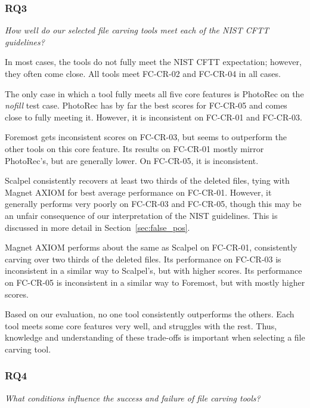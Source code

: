 \subsubsection{RQ3}

\emph{How well do our selected file carving tools meet each of the NIST CFTT guidelines?}

In most cases, the tools do not fully meet the NIST CFTT expectation; however, they often come close.
All tools meet FC-CR-02 and FC-CR-04 in all cases.

The only case in which a tool fully meets all five core features is PhotoRec on the \emph{nofill} test case.
PhotoRec has by far the best scores for FC-CR-05 and comes close to fully meeting it.
However, it is inconsistent on FC-CR-01 and FC-CR-03.

Foremost gets inconsistent scores on FC-CR-03, but seems to outperform the other tools on this core feature.
Its results on FC-CR-01 mostly mirror PhotoRec's, but are generally lower.
On FC-CR-05, it is inconsistent.

Scalpel consistently recovers at least two thirds of the deleted files, tying with Magnet AXIOM for best average performance on FC-CR-01.
However, it generally performs very poorly on FC-CR-03 and FC-CR-05, though this may be an unfair consequence of our interpretation of the NIST guidelines.
This is discussed in more detail in Section~\ref{sec:false_pos}.

Magnet AXIOM performs about the same as Scalpel on FC-CR-01, consistently carving over two thirds of the deleted files.
Its performance on FC-CR-03 is inconsistent in a similar way to Scalpel's, but with higher scores.
Its performance on FC-CR-05 is inconsistent in a similar way to Foremost, but with mostly higher scores.

Based on our evaluation, no one tool consistently outperforms the others.
Each tool meets some core features very well, and struggles with the rest.
Thus, knowledge and understanding of these trade-offs is important when selecting a file carving tool.




\subsubsection{RQ4}

\emph{What conditions influence the success and failure of file carving tools?}

